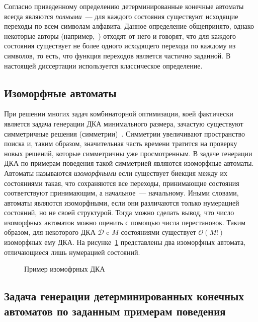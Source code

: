Согласно приведенному определению детерминированные конечные автоматы всегда являются \emph{полными}~--- для каждого состояния существуют исходящие переходы по всем символам алфавита. 
Данное определение общепринято, однако некоторые авторы (например,~\cite{mogensen-analysis-11}) отходят от него и говорят, что для каждого состояния существует не более одного исходящего перехода по каждому из символов, то есть, что функция переходов является частично заданной.
В настоящей диссертации используется классическое определение.

\subsection{Изоморфные автоматы}
\label{sec:review:dfa-inf:isomorphic-automata}

При решении многих задач комбинаторной оптимизации, коей фактически является задача генерации ДКА минимального размера, зачастую существуют симметричные решения (симметрии)~\cite{DBLP:conf/aaai/Walsh12}.
Симметрии увеличивают пространство поиска и, таким образом, значительная часть времени тратится на проверку новых решений, которые симметричны уже просмотренным.
В задаче генерации ДКА по примерам поведения такой симметрией являются изоморфные автоматы.
Автоматы называются \emph{изоморфными} если существует биекция между их состояниями такая, что сохраняются все переходы, принимающие состояния соответствуют принимающим, а начальное~--- начальному.
Иными словами, автоматы являются изоморфными, если они различаются только нумерацией состояний, но не своей структурой.
Тогда можно сделать вывод, что число изоморфных автоматов можно оценить с помощью числа перестановок.
Таким образом, для некоторого ДКА $\mathcal{D}$ c $M$ состояниями существует $\mathcal{O}\left(M!\right)$ изоморфных ему ДКА.
На рисунке~\ref{img:iso-ex} представлены два изоморфных автомата, отличающиеся лишь нумерацией состояний.

\begin{figure}[ht]
  \centering
  \ifafour
    
  \else
    
  \fi
  \caption{Пример изомофрных ДКА}
  \label{img:iso-ex}
\end{figure}

\subsection{Задача генерации детерминированных конечных автоматов по заданным примерам поведения}
\label{sec:review:dfa-inf:task}

